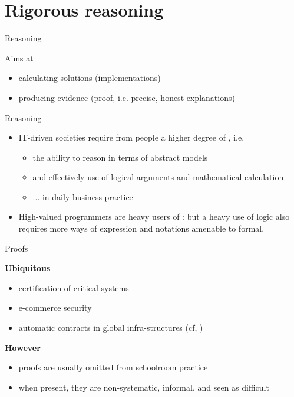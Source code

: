 \documentclass{beamer}
\begin{document}
\section{Rigorous reasoning}

\begin{slide}{Reasoning}

Aims at
\begin{itemize}
\item calculating solutions (implementations)
\item producing evidence (proof, i.e. precise, honest explanations)
\end{itemize}

\begin{center}
\end{center}
\end{slide}

\begin{slide}{Reasoning}
\begin{itemize}
\item
IT-driven societies  require from people a higher degree of , i.e.
\begin{itemize}
\item the ability to reason in terms of abstract models 
\item and effectively use of logical arguments and mathematical calculation
\item ... in daily 
business practice
\end{itemize}
\item  High-valued programmers are heavy users of :
 but a heavy use of logic also requires more  ways of expression and
notations amenable to formal, 
\end{itemize}
\end{slide}





\begin{slide}{Proofs}
\small

{\bf Ubiquitous }
\begin{itemize}
\item certification of critical systems 
\item e-commerce security
\item automatic contracts in global infra-structures (cf, )
\end{itemize}
\vspace{0.5cm}

{\bf However }
\begin{itemize}
\item  proofs are usually omitted from schoolroom practice
\item when present, they are non-systematic, informal, and seen as difficult
\end{itemize}

\end{slide}
\end{document}

